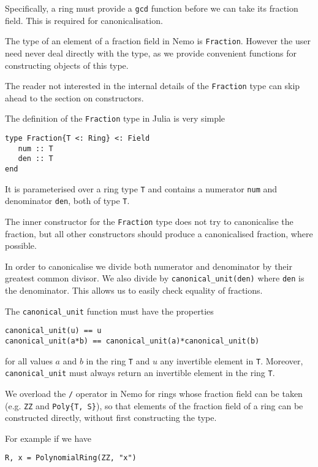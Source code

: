 \documentclass[a4paper,10pt]{article}
\newcommand{\code}{\lstinline}
\begin{document}
{{{Specifically, a ring must provide a \code{gcd} function before we can take its
fraction field. This is required for canonicalisation.

The type of an element of a fraction field in Nemo is \code{Fraction}. However
the user need never deal directly with the type, as we provide convenient
functions for constructing objects of this type.

The reader not interested in the internal details of the \code{Fraction} type
can skip ahead to the section on constructors.

The definition of the \code{Fraction} type in Julia is very simple

\begin{lstlisting}
type Fraction{T <: Ring} <: Field
   num :: T
   den :: T
end
\end{lstlisting}

It is parameterised over a ring type \code{T} and contains a numerator 
\code{num} and denominator \code{den}, both of type \code{T}.

The inner constructor for the \code{Fraction} type does not try to canonicalise
the fraction, but all other constructors should produce a canonicalised
fraction, where possible.

In order to canonicalise we divide both numerator and denominator by their
greatest common divisor. We also divide by \code{canonical_unit(den)} where
\code{den} is the denominator. This allows us to easily check equality of
fractions.

The \code{canonical_unit} function must have the properties

\begin{lstlisting}
canonical_unit(u) == u
canonical_unit(a*b) == canonical_unit(a)*canonical_unit(b)
\end{lstlisting}

for all values $a$ and $b$ in the ring \code{T} and $u$ any invertible element
in \code{T}. Moreover, \code{canonical_unit} must always return an invertible
element in the ring \code{T}.

We overload the \code{/} operator in Nemo for rings whose fraction field can
be taken (e.g. \code{ZZ} and \code|Poly{T, S}|), so that elements of the
fraction field of a ring can be constructed directly, without first
constructing the type.

For example if we have

\begin{lstlisting}
R, x = PolynomialRing(ZZ, "x")


\end{lstlisting}}}}
\end{document}
